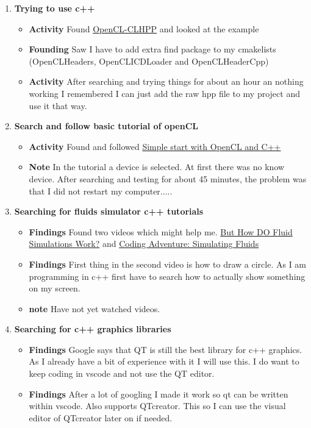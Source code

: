 \documentclass{article}
\begin{document}
\begin{enumerate}
    \item \textbf{Trying to use c++}
    \begin{itemize}
        \item \textbf{Activity} Found \href{https://github.com/KhronosGroup/OpenCL-CLHPP}{OpenCL-CLHPP} and looked at the example
        \item \textbf{Founding} Saw I have to add extra find package to my cmakelists (OpenCLHeaders, OpenCLICDLoader and OpenCLHeaderCpp)
        \item \textbf{Activity} After searching and trying things for about an hour an nothing working I remembered I can just add the raw hpp file to my project and use it that way.
    \end{itemize}

    \item \textbf{Search and follow basic tutorial of openCL}
    \begin{itemize}
        \item \textbf{Activity} Found and followed \href{https://programmerclick.com/article/47811146604/}{Simple start with OpenCL and C++}
        \item \textbf{Note} In the tutorial a device is selected. At first there was no know device. After searching and testing for about 45 minutes, the problem was that I did not restart my computer.....
    \end{itemize}

    \item \textbf{Searching for fluids simulator c++ tutorials}
    \begin{itemize}
        \item \textbf{Findings} Found two videos which might help me. \href{https://www.youtube.com/watch?v=qsYE1wMEMPA}{But How DO Fluid Simulations Work?} and \href{https://www.youtube.com/watch?v=rSKMYc1CQHE}{Coding Adventure: Simulating Fluids}
        \item \textbf{Findings} First thing in the second video is how to draw a circle. As I am programming in c++ first have to search how to actually show something on my screen.
        \item \textbf{note} Have not yet watched videos.
    \end{itemize}
    
    \item \textbf{Searching for c++ graphics libraries}
    \begin{itemize}
        \item \textbf{Findings} Google says that QT is still the best library for c++ graphics. As I already have a bit of experience with it I will use this. I do want to keep coding in vscode and not use the QT editor.
        \item \textbf{Findings} After a lot of googling I made it work so qt can be written within vscode. Also supports QTcreator. This so I can use the visual editor of QTcreator later on if needed.
    \end{itemize}
\end{enumerate}
\end{document}
